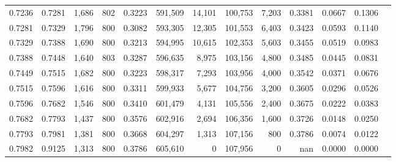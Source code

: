 \begin{tabular}{rrrrrrrrrrrrr}
0.7236 & 0.7281 &  1,686 & 802 &                                     0.3223 & 591,509 &  14,101 & 100,753 &   7,203 & 0.3381 & 0.0667 & 0.1306 \\
0.7281 & 0.7329 &  1,796 & 800 &                                     0.3082 & 593,305 &  12,305 & 101,553 &   6,403 & 0.3423 & 0.0593 & 0.1140 \\
0.7329 & 0.7388 &  1,690 & 800 &                                     0.3213 & 594,995 &  10,615 & 102,353 &   5,603 & 0.3455 & 0.0519 & 0.0983 \\
0.7388 & 0.7448 &  1,640 & 803 &                                     0.3287 & 596,635 &   8,975 & 103,156 &   4,800 & 0.3485 & 0.0445 & 0.0831 \\
0.7449 & 0.7515 &  1,682 & 800 &                                     0.3223 & 598,317 &   7,293 & 103,956 &   4,000 & 0.3542 & 0.0371 & 0.0676 \\
0.7515 & 0.7596 &  1,616 & 800 &                                     0.3311 & 599,933 &   5,677 & 104,756 &   3,200 & 0.3605 & 0.0296 & 0.0526 \\
0.7596 & 0.7682 &  1,546 & 800 &                                     0.3410 & 601,479 &   4,131 & 105,556 &   2,400 & 0.3675 & 0.0222 & 0.0383 \\
0.7682 & 0.7793 &  1,437 & 800 &                                     0.3576 & 602,916 &   2,694 & 106,356 &   1,600 & 0.3726 & 0.0148 & 0.0250 \\
0.7793 & 0.7981 &  1,381 & 800 &                                     0.3668 & 604,297 &   1,313 & 107,156 &     800 & 0.3786 & 0.0074 & 0.0122 \\
0.7982 & 0.9125 &  1,313 & 800 &                                     0.3786 & 605,610 &       0 & 107,956 &       0 &    nan & 0.0000 & 0.0000 \\
\bottomrule
\end{tabular}

